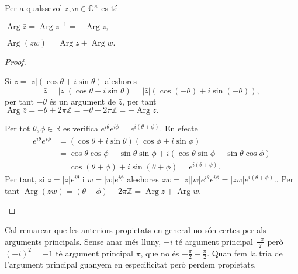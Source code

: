\documentclass[12pt,twoside]{report}
\numberwithin{table}{section}
\numberwithin{equation}{section}
\numberwithin{figure}{section}
\newcommand{\Z}{\ensuremath{\mathbb{Z}}}
\newcommand{\R}{\ensuremath{\mathbb{R}}}
\newcommand{\Cu}{\ensuremath{\mathbb{C}^\times}}
\newcommand{\abs}[1]{\left\lvert #1 \right\rvert}
\DeclareMathOperator{\Arg}{Arg}
\begin{document}
\begin{prop}[name=Propietats de l'argument]\label{prop:propietats de l'argument}
Per a qualssevol \( z, w \in \Cu \) es té
	\begin{punts}
	\item \( \Arg \bar{z} = \Arg z^{-1} = - \Arg{z}, \) 
	\item \( \Arg{(zw)} = \Arg z + \Arg w. \)
	\end{punts}
\end{prop}

\begin{proof}
	\begin{punts}
	\item	Si \( z = \abs{z}(\cos{\theta} + i \sin{\theta}) \) aleshores \[ \bar{z} = \abs{z}(\cos{\theta} - i\sin{\theta}) = \abs{\bar{z}}(\cos{(-\theta)} + i \sin{(-\theta)}), \] per tant \( -\theta \) és un argument de \( \bar{z} \), per tant \( \Arg{\bar{z}} = -\theta + 2\pi\Z = -\theta - 2\pi\Z = - \Arg{z}. \)

	\item Per tot \( \theta, \phi \in \R \) es verifica \( e^{i\theta}e^{i\phi} = e^{i(\theta + \phi)} \). En efecte
		\begin{align*}
			e^{i\theta}e^{i\phi} & = (\cos{\theta} + i \sin{\theta})(\cos{\phi} + i \sin{\phi}) \\
													 & = \cos{\theta}\cos{\phi} - \sin{\theta}\sin{\phi} + i(\cos{\theta}\sin{\phi} + \sin{\theta}\cos{\phi}) \\
													 & = \cos{(\theta + \phi)} + i \sin{(\theta + \phi)} = e^{i(\theta + \phi)}.
		\end{align*}
		Per tant, si \( z = \abs{z}e^{i\theta} \) i \( w = \abs{w}e^{i\phi} \) aleshores \( zw = \abs{z}\abs{w} e^{i\theta} e^{i\phi} = \abs{zw} e^{i(\theta + \phi)}. \). Per tant \( \Arg{(zw)} = (\theta + \phi) + 2\pi\Z = \Arg{z} + \Arg{w} \). \qedhere
	\end{punts}
\end{proof}

Cal remarcar que les anteriors propietats en general no són certes per als arguments principals. Sense anar més lluny, \( -i \) té argument principal \( \frac{-\pi}{2} \) però \( (-i)^2 = -1 \) té argument principal \( \pi \), que no és \( -\frac{\pi}{2} - \frac{\pi}{2} \). Quan fem la tria de l'argument principal guanyem en especificitat però perdem propietats.
\end{document}

